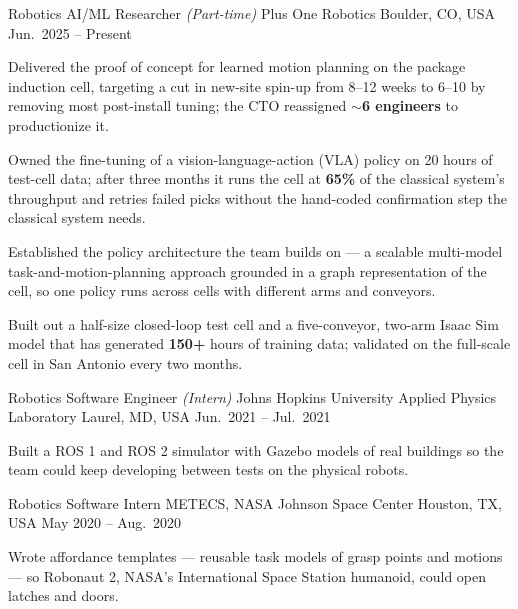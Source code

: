 
\begin{cventries}

  \cventry
    {Robotics AI/ML Researcher {\normalfont\itshape (Part-time)}}
    {Plus One Robotics}
    {Boulder, CO, USA}
    {Jun.\ 2025 -- Present}
    {
      \begin{cvitems}
        \item Delivered the proof of concept for learned motion planning on the package induction cell, targeting a cut in new-site spin-up from 8--12 weeks to 6--10 by removing most post-install tuning; the CTO reassigned \textbf{$\sim$6 engineers} to productionize it.
        \item Owned the fine-tuning of a vision-language-action (VLA) policy on 20 hours of test-cell data; after three months it runs the cell at \textbf{65\%} of the classical system's throughput and retries failed picks without the hand-coded confirmation step the classical system needs.
        \item Established the policy architecture the team builds on --- a scalable multi-model task-and-motion-planning approach grounded in a graph representation of the cell, so one policy runs across cells with different arms and conveyors.
        \item Built out a half-size closed-loop test cell and a five-conveyor, two-arm Isaac Sim model that has generated \textbf{150+} hours of training data; validated on the full-scale cell in San Antonio every two months.
      \end{cvitems}
    }

  \cventry
    {Robotics Software Engineer {\normalfont\itshape (Intern)}}
    {Johns Hopkins University Applied Physics Laboratory}
    {Laurel, MD, USA}
    {Jun.\ 2021 -- Jul.\ 2021}
    {
      \begin{cvitems}
        \item Built a ROS 1 and ROS 2 simulator with Gazebo models of real buildings so the team could keep developing between tests on the physical robots.
      \end{cvitems}
    }

  \cventry
    {Robotics Software Intern}
    {METECS, NASA Johnson Space Center}
    {Houston, TX, USA}
    {May 2020 -- Aug.\ 2020}
    {
      \begin{cvitems}
        \item Wrote affordance templates --- reusable task models of grasp points and motions --- so Robonaut 2, NASA's International Space Station humanoid, could open latches and doors.
      \end{cvitems}
    }

\end{cventries}
